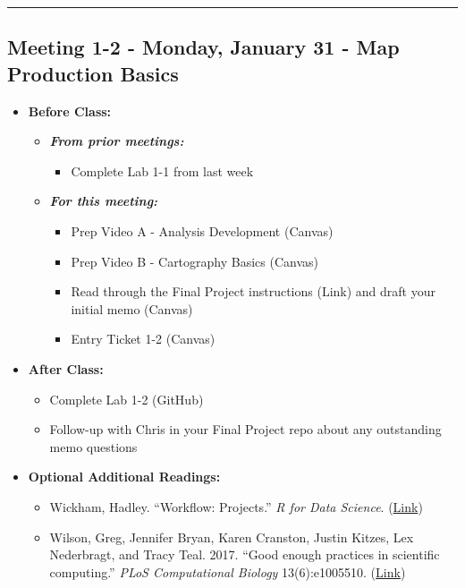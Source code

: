 \documentclass[
]{book}
\providecommand{\tightlist}{%
  \setlength{\itemsep}{0pt}\setlength{\parskip}{0pt}}
\begin{document}
\begin{center}\rule{0.5\linewidth}{0.5pt}\end{center}

\hypertarget{meeting-1-2---monday-january-31---map-production-basics}{%
\subsection*{Meeting 1-2 - Monday, January 31 - Map Production Basics}\label{meeting-1-2---monday-january-31---map-production-basics}}

\begin{itemize}
\tightlist
\item
  \textbf{Before Class:}

  \begin{itemize}
  \tightlist
  \item
    \textbf{\emph{From prior meetings:}}

    \begin{itemize}
    \tightlist
    \item
      Complete Lab 1-1 from last week
    \end{itemize}
  \item
    \textbf{\emph{For this meeting:}}

    \begin{itemize}
    \tightlist
    \item
      Prep Video A - Analysis Development (Canvas)
    \item
      Prep Video B - Cartography Basics (Canvas)
    \item
      Read through the Final Project instructions (Link) and draft your initial memo (Canvas)
    \item
      Entry Ticket 1-2 (Canvas)
    \end{itemize}
  \end{itemize}
\item
  \textbf{After Class:}

  \begin{itemize}
  \tightlist
  \item
    Complete Lab 1-2 (GitHub)
  \item
    Follow-up with Chris in your Final Project repo about any outstanding memo questions
  \end{itemize}
\item
  \textbf{Optional Additional Readings:}

  \begin{itemize}
  \tightlist
  \item
    Wickham, Hadley. ``Workflow: Projects.'' \emph{R for Data Science}. (\href{https://r4ds.had.co.nz/workflow-projects.html}{Link})
  \item
    Wilson, Greg, Jennifer Bryan, Karen Cranston, Justin Kitzes, Lex Nederbragt, and Tracy Teal. 2017. ``Good enough practices in scientific computing.'' \emph{PLoS Computational Biology} 13(6):e1005510. (\href{https://journals.plos.org/ploscompbiol/article?id=10.1371/journal.pcbi.1005510}{Link})
  \end{itemize}
\end{itemize}
\end{document}
